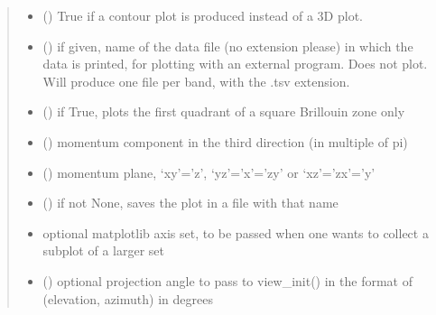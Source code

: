 \documentclass[letterpaper,10pt,english]{sphinxmanual}
\begin{document}
\begin{fulllineitems}
\begin{quote}
\begin{description}
\begin{itemize}
\item {} 
\sphinxAtStartPar
{} () \textendash{} True if a contour plot is produced instead of a 3D plot.

\item {} 
\sphinxAtStartPar
{} () \textendash{} if given, name of the data file (no extension please) in which the data is printed, for plotting with an external program. Does not plot. Will produce one file per band, with the .tsv extension.

\item {} 
\sphinxAtStartPar
{} () \textendash{} if True, plots the first quadrant of a square Brillouin zone only

\item {} 
\sphinxAtStartPar
{} () \textendash{} momentum component in the third direction (in multiple of pi)

\item {} 
\sphinxAtStartPar
{} () \textendash{} momentum plane, ‘xy’=’z’, ‘yz’=’x’=’zy’ or ‘xz’=’zx’=’y’

\item {} 
\sphinxAtStartPar
{} () \textendash{} if not None, saves the plot in a file with that name

\item {} 
\sphinxAtStartPar
{} \textendash{} optional matplotlib axis set, to be passed when one wants to collect a subplot of a larger set

\item {} 
\sphinxAtStartPar
{} () \textendash{} optional projection angle to pass to view\_init() in the format of (elevation, azimuth) in degrees


\end{itemize}
\end{description}
\end{quote}
\end{fulllineitems}
\end{document}
